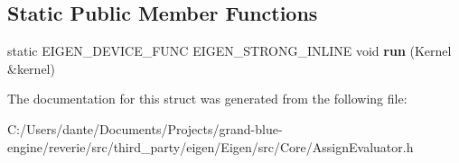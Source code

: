 \subsection*{Static Public Member Functions}
\begin{DoxyCompactItemize}
\item 
\mbox{\label{struct_eigen_1_1internal_1_1copy__using__evaluator__innervec___complete_unrolling_a5d26f02f41e78b2e18e0294a22393ebb}} 
static E\+I\+G\+E\+N\+\_\+\+D\+E\+V\+I\+C\+E\+\_\+\+F\+U\+NC E\+I\+G\+E\+N\+\_\+\+S\+T\+R\+O\+N\+G\+\_\+\+I\+N\+L\+I\+NE void {\bfseries run} (Kernel \&kernel)
\end{DoxyCompactItemize}


The documentation for this struct was generated from the following file\+:\begin{DoxyCompactItemize}
\item 
C\+:/\+Users/dante/\+Documents/\+Projects/grand-\/blue-\/engine/reverie/src/third\+\_\+party/eigen/\+Eigen/src/\+Core/Assign\+Evaluator.\+h\end{DoxyCompactItemize}
